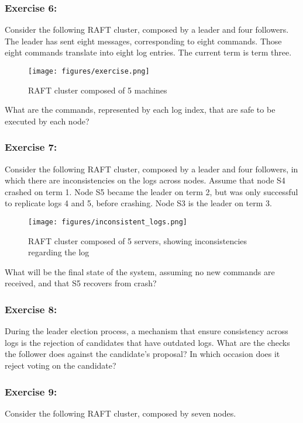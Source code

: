 \documentclass[12pt,a4paper]{article}
\begin{document}
\subsubsection*{Exercise 6:} Consider the following RAFT cluster, composed by a leader and four followers. The leader has sent eight messages, corresponding to eight commands. Those eight commands translate into eight log entries. The current term is term three. 
\begin{figure}[H]
    \centering
    \texttt{[image: figures/exercise.png]}
    \caption{RAFT cluster composed of 5 machines}
    \label{fig:RAFT_cluster}
\end{figure}

What are the commands, represented by each log index, that are safe to be executed by each node?

\subsubsection*{Exercise 7:} Consider the following RAFT cluster, composed by a leader and four followers, in which there are inconsistencies on the logs across nodes. Assume that node S4 crashed on term 1. Node S5 became the leader on term 2, but was only successful to replicate logs 4 and 5, before crashing. Node S3 is the leader on term 3.

\begin{figure}[H]
    \centering
    \texttt{[image: figures/inconsistent\_logs.png]}
    \caption{RAFT cluster composed of 5 servers, showing inconsistencies regarding the log}
    \label{fig:inconsistent_logs}
\end{figure}

What will be the final state of the system, assuming no new commands are received, and that S5 recovers from crash?


\subsubsection*{Exercise 8:} During the leader election process, a mechanism that ensure consistency across logs is the rejection of candidates that have outdated logs. What are the checks the follower does against the candidate's proposal? In which occasion does it reject voting on the candidate?


\subsubsection*{Exercise 9:} Consider the following RAFT cluster, composed by seven nodes.
\end{document}
